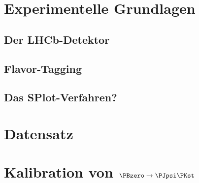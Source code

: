 
\section{Experimentelle Grundlagen}

\subsection{Der LHCb-Detektor}

\subsection{Flavor-Tagging}


\subsection{Das SPlot-Verfahren?}

\section{Datensatz}

\section{\texorpdfstring{Kalibration von $\PBzero \to \PJpsi \PKst$}{Kalibration von B0 -> JpsiKst}}


